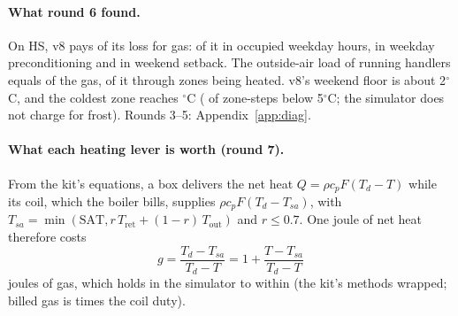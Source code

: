 \documentclass{article}
\begin{document}
\paragraph{What round 6 found.} On HS, v8 pays \RSixDecGas{} of its loss for gas: \RSixDecOccWd{} of it in occupied weekday hours, \RSixDecPreWd{} in weekday preconditioning and \RSixDecSbWe{} in weekend setback. The outside-air load of running handlers equals \RSixDecVent{} of the gas, \RSixDecVentHeated{} of it through zones being heated. v8's weekend floor is about 2$^\circ$C, and the coldest zone reaches \RSixDecColdestWe$^\circ$C (\RSixDecBelowFive{} of zone-steps below 5$^\circ$C; the simulator does not charge for frost). Rounds 3--5: Appendix~\ref{app:diag}.

\paragraph{What each heating lever is worth (round 7).}
From the kit's equations, a box delivers the net heat $Q=\rho c_p F (T_d - T)$ while its coil, which the boiler bills, supplies $\rho c_p F (T_d - T_{sa})$, with $T_{sa}=\min(\text{SAT}, r\,T_{\text{ret}} + (1-r)\,T_{\text{out}})$ and $r\le 0.7$. One joule of net heat therefore costs
\begin{equation}
g = \frac{T_d - T_{sa}}{T_d - T} = 1 + \frac{T - T_{sa}}{T_d - T}
\label{eq:g}
\end{equation}
joules of gas, which holds in the simulator to within \RSevGErr{} (the kit's methods wrapped; billed gas is \RSevGasOverCoil{} times the coil duty).
\end{document}
